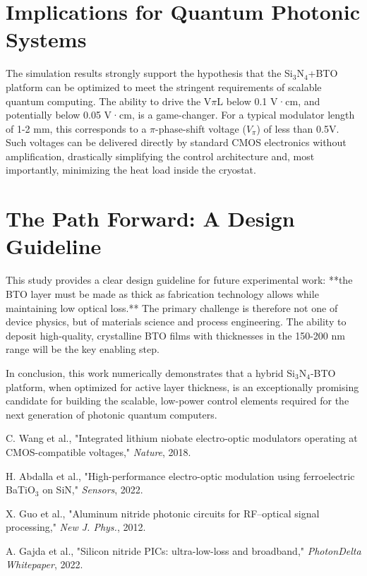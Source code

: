 \documentclass[12pt, a4paper, numbers]{report}
\begin{document}
\section{Implications for Quantum Photonic Systems}
The simulation results strongly support the hypothesis that the Si$_3$N$_4$+BTO platform can be optimized to meet the stringent requirements of scalable quantum computing. The ability to drive the V$\pi$L below 0.1 V·cm, and potentially below 0.05 V·cm, is a game-changer. For a typical modulator length of 1-2 mm, this corresponds to a $\pi$-phase-shift voltage ($V_{\pi}$) of less than 0.5V. Such voltages can be delivered directly by standard CMOS electronics without amplification, drastically simplifying the control architecture and, most importantly, minimizing the heat load inside the cryostat.

\section{The Path Forward: A Design Guideline}
This study provides a clear design guideline for future experimental work: **the BTO layer must be made as thick as fabrication technology allows while maintaining low optical loss.** The primary challenge is therefore not one of device physics, but of materials science and process engineering. The ability to deposit high-quality, crystalline BTO films with thicknesses in the 150-200 nm range will be the key enabling step.

In conclusion, this work numerically demonstrates that a hybrid Si$_3$N$_4$-BTO platform, when optimized for active layer thickness, is an exceptionally promising candidate for building the scalable, low-power control elements required for the next generation of photonic quantum computers.


\begin{thebibliography}{9}
C. Wang et al., "Integrated lithium niobate electro-optic modulators operating at CMOS-compatible voltages," \textit{Nature}, 2018.

H. Abdalla et al., "High-performance electro-optic modulation using ferroelectric BaTiO$_3$ on SiN," \textit{Sensors}, 2022.

X. Guo et al., "Aluminum nitride photonic circuits for RF–optical signal processing," \textit{New J. Phys.}, 2012.

A. Gajda et al., "Silicon nitride PICs: ultra-low-loss and broadband," \textit{PhotonDelta Whitepaper}, 2022.
\end{thebibliography}

\end{document}
